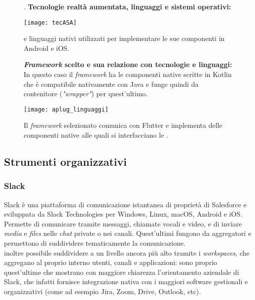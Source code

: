 \begin{figure}[H].
    \textbf{Tecnologie realtà aumentata, linguaggi e sistemi operativi:}
    \begin{center}
    \texttt{[image: tecASA]}
    \caption[\asa{} e linguaggi]{\asa{} e linguaggi nativi utilizzati per implementare le sue componenti in Android e iOS.}
    \end{center}
\end{figure}

\begin{figure}[H]
    \textbf{\textit{Framework} scelto e sua relazione con tecnologie e linguaggi:}\\
    In questo caso il \textit{framework} ha le componenti native scritte in Kotlin che è compatibile nativamente con Java e funge quindi da contenitore (\textit{"wrapper"}) per quest'ultimo.\\
    \begin{center}
    \texttt{[image: aplug\_linguaggi]}
    \caption[\textit{Framework}, Flutter e \asa{}]{Il \textit{framework} selezionato comunica con Flutter e implementa delle componenti native alle quali si interfacciano le \asa{}.}
    \end{center}
\end{figure}
\subsection{Strumenti organizzativi}
\subsubsection{Slack}
Slack è una piattaforma di comunicazione istantanea di proprietà di Salesforce e sviluppata da Slack Technologies per Windows, Linux, macOS, Android e iOS.\\
Permette di comunicare tramite messaggi, chiamate vocali e video, e di inviare \textit{media} e \textit{files} nelle \textit{chat} private o nei canali. Quest'ultimi fungono da aggregatori e permettono di suddividere tematicamente la comunicazione.\\
\e{} inoltre possibile suddividere a un livello ancora più alto tramite i \textit{workspaces}, che aggregano al proprio interno utenti, canali e applicazioni: sono proprio quest'ultime che mostrano con maggiore chiarezza l'orientamento aziendale di Slack, che infatti fornisce integrazione nativa con i maggiori software gestionali e organizzativi (come ad esempio Jira, Zoom, Drive, Outlook, etc).


